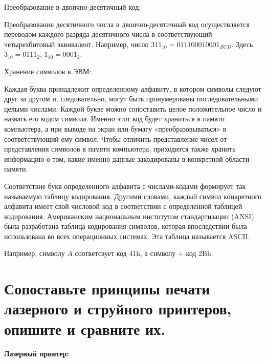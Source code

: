 \documentclass[unicode, 12pt, a4paper, oneside]{article}
\begin{document}
Преобразование в двоично-десятичный код:

Преобразование десятичного числа в двоично-десятичный код осуществляется переводом каждого разряда десятичного числа в соответствующий четырехбитовый эквивалент. Например, число $ 311_{10} = 011100010001_{BCD} $. Здесь  $3_{10} = 0111_{2}$, $1_{10} = 0001_{2}$.

Хранение символов в ЭВМ:

Каждая буква принадлежит определенному алфавиту, в котором символы следуют друг за другом и, следовательно, могут быть пронумерованы последовательными целыми числами. Каждой букве можно сопоставить целое положительное число и назвать его кодом символа. Именно этот код будет храниться в памяти компьютера, а при выводе на экран или бумагу «преобразовываться» в соответствующий ему символ. Чтобы отличить представление чисел от представления символов в памяти компьютера, приходится также хранить информацию о том, какие именно данные закодированы в конкретной области памяти.

Соответствие букв определенного алфавита с числами-кодами формирует так называемую таблицу кодирования. Другими словами, каждый символ конкретного алфавита имеет свой числовой код в соответствии с определенной таблицей кодирования. Американским национальным институтом стандартизации (ANSI) была разработана таблица кодирования символов, которая впоследствии была использована во всех операционных системах. Эта таблица называется ASCII.

Например, символу $A$ соответсвует код 41h, а символу $+$ код 2Bh. 

\section{Сопоставьте принципы печати лазерного и струйного принтеров, опишите и сравните их.}

{\bf Лазерный принтер:}
\end{document}
